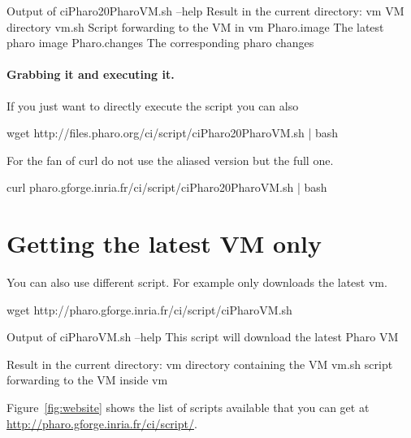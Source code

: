 \documentclass[a4paper,10pt,twoside]{book}
\begin{document}
\begin{code}{Output of ciPharo20PharoVM.sh --help }
Result in the current directory:
    vm               VM directory
    vm.sh            Script forwarding to the VM in vm
    Pharo.image      The latest pharo image
    Pharo.changes    The corresponding pharo changes
\end{code}


\paragraph{Grabbing it and executing it.}
If you just want to directly execute the script you can also 


\begin{code}{}
wget http://files.pharo.org/ci/script/ciPharo20PharoVM.sh | bash
\end{code}

For the fan of curl do not use the aliased version but the full one.
\begin{code}{}
curl pharo.gforge.inria.fr/ci/script/ciPharo20PharoVM.sh | bash
\end{code}

\section{Getting the latest VM only}
You can also use different script. For example  only downloads the latest vm.

\begin{code}{}
wget http://pharo.gforge.inria.fr/ci/script/ciPharoVM.sh
\end{code}

\begin{code}{Output of ciPharoVM.sh --help}
This script will download the latest Pharo VM

Result in the current directory:
    vm               directory containing the VM
    vm.sh            script forwarding to the VM inside vm
\end{code}


Figure~\ref{fig:website} shows the list of scripts available that you can get at \url{http://pharo.gforge.inria.fr/ci/script/}.
\end{document}
